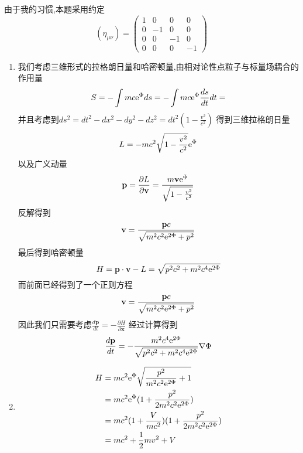\begin{solution}
由于我的习惯,本题采用约定
$$(\eta_{\mu\nu})=
    \begin{pmatrix}
    1&0&0&0\\
    0&-1&0&0\\
    0&0&-1&0\\
    0&0&0&-1
    \end{pmatrix}$$
    \begin{enumerate}[label=(\arabic*)]
    \item 我们考虑三维形式的拉格朗日量和哈密顿量,由相对论性点粒子与标量场耦合的作用量
    $$S=-\int mc\mathrm e^{\Phi}ds=-\int mc\mathrm e^{\Phi}\frac{ds}{dt}dt=$$
    并且考虑到$ds^2=dt^2-dx^2-dy^2-dz^2=dt^2(1-\frac{v^2}{c^2})$
    得到三维拉格朗日量$$L=-mc^2\sqrt{1-\frac{v^2}{c^2}}\mathrm e^{\Phi}$$
    以及广义动量
    $$\textbf{p}=\frac{\partial L}{\partial \textbf{v}}=\frac{m\textbf{v}\mathrm e^{\Phi}}{\sqrt{1-\frac{v^2}{c^2}}}$$
    反解得到
    $$\textbf{v}=\frac{\textbf{p}c}{\sqrt{m^2c^2\mathrm e^{2\Phi}+p^2}}$$
    最后得到哈密顿量
    $$H=\textbf{p}\cdot{\textbf{v}}-L=\sqrt{p^2c^2+m^2c^4\mathrm e^{2\Phi}}$$
    而前面已经得到了一个正则方程
    $$\textbf{v}=\frac{\textbf{p}c}{\sqrt{m^2c^2\mathrm e^{2\Phi}+p^2}}$$
    因此我们只需要考虑$\frac{d\textbf{p}}{dt}=-\frac{\partial H}{\partial \textbf{x}}$
    经过计算得到
    $$\frac{d\textbf{p}}{dt}=-\frac{m^2c^4\mathrm e^{2\Phi}}{\sqrt{p^2c^2+m^2c^4\mathrm e^{2\Phi}}}\nabla\Phi$$
    \item 
    \begin{align*}
        H&=mc^2\mathrm e^{\Phi}\sqrt{\frac{p^2}{m^2c^2\mathrm e^{2\Phi}}+1}\\
         &=mc^2\mathrm e^{\Phi}(1+\frac{p^2}{2m^2c^2\mathrm e^{2\Phi}})\\
         &=mc^2(1+\frac{V}{mc^2})(1+\frac{p^2}{2m^2c^2\mathrm e^{2\Phi}})\\
         &=mc^2+\frac12mv^2+V
    \end{align*}
    \end{enumerate}
\end{solution}
